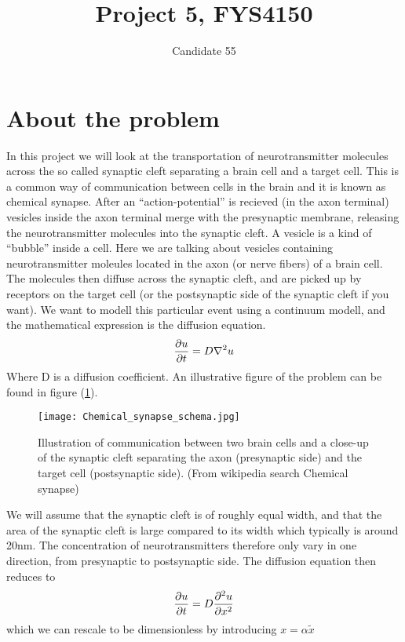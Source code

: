 \documentclass[a4paper,english, 10pt, twoside]{article}
\title{Project 5, FYS4150}
\author{Candidate 55}
\renewcommand{\d}{\partial}
\begin{document}
\maketitle
\newpage
\tableofcontents
\newpage
\section{About the problem}\label{intro}
In this project we will look at the transportation of neurotransmitter molecules across the so called synaptic cleft separating a 
brain cell and a target cell. This is a common way of communication between cells in the brain and it is known as chemical synapse.
After an ``action-potential'' is recieved (in the axon terminal) vesicles inside the axon terminal merge with the 
presynaptic membrane, releasing the neurotransmitter molecules into the synaptic cleft. 
A vesicle is a kind of ``bubble'' inside a cell. Here we are talking about vesicles containing neurotransmitter moleules located in the axon (or 
nerve fibers) of a brain cell. The molecules then diffuse across the synaptic cleft, and are picked up by receptors on the target cell (or the 
postsynaptic side of the synaptic cleft if you want). We want to modell this particular event using a continuum modell, and the mathematical 
expression is the diffusion equation.
\begin{equation*}
{\d u \over \d t} = D\nabla^2 u 
\end{equation*}
Where D is a diffusion coefficient. An illustrative figure of the problem can be found in figure (\ref{synapse}).
\begin{figure}[H]
 \centering
 \texttt{[image: Chemical\_synapse\_schema.jpg]}
 \caption{Illustration of communication between two brain cells and a close-up of the synaptic cleft separating the axon (presynaptic side) and
 the target cell (postsynaptic side). (From wikipedia search Chemical synapse) }
 \label{synapse}
\end{figure}
We will assume that the synaptic cleft is of roughly equal width, and that the area of the synaptic cleft is large compared to its width which typically 
is around 20nm. The 
concentration of neurotransmitters therefore only vary in one direction, from presynaptic to postsynaptic side. The diffusion equation then reduces 
to
\begin{equation*}
 {\d u \over \d t} = D{\d^2 u \over \d x^2}
\end{equation*}
which we can rescale to be dimensionless by introducing $x = \alpha\tilde{x} $
\end{document}

